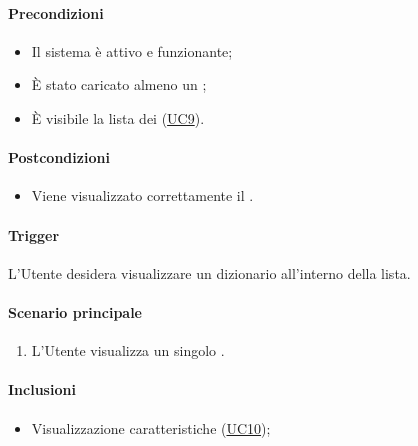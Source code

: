\paragraph*{Precondizioni}
\begin{itemize}
  \item Il sistema è attivo e funzionante;
  \item È stato caricato almeno un ;
  \item È visibile la lista dei  (\hyperref[UC9]{UC9}).
\end{itemize}

\paragraph*{Postcondizioni}
\begin{itemize}
  \item Viene visualizzato correttamente il .
\end{itemize}

\paragraph*{Trigger}
L'Utente desidera visualizzare un dizionario all'interno della lista.

\paragraph*{Scenario principale}
\begin{enumerate}
  \item L'Utente visualizza un singolo .
\end{enumerate}

\paragraph*{Inclusioni}
\begin{itemize}
  \item Visualizzazione caratteristiche  (\hyperref[UC10]{UC10});
\end{itemize}
